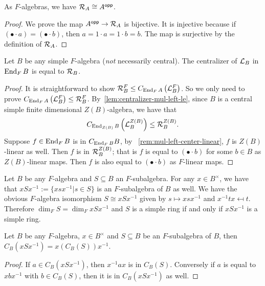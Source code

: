  \begin{lemma}\label{lem:mul-right-iso-opp}
   As $F$-algebras, we have $\mathcal{R}_{A}\cong A^{\mathsf{opp}}$. \leanok
 \end{lemma}
 \begin{proof}
   We prove the map $A^{\mathsf{opp}} \to \mathcal{R}_{A}$ is bijective. It is injective
   because if $\left(\bullet \cdot a\right) = \left(\bullet\cdot b\right)$, then
   $a = 1 \cdot a = 1 \cdot b = b$. The map is surjective by the definition of
   $\mathcal{R}_{A}$.
 \end{proof}
 \begin{lemma}\label{lem:centralizer-mul-left-eq-mul-right}
   Let $B$ be any simple $F$-algebra ({\em not\/} necessarily central). The
   centralizer of $\mathcal{L}_{B}$ in $\operatorname{End}_{F}B$ is equal to $\mathcal{R}_{B}$. \leanok
 \end{lemma}
 \begin{proof}
   It is straightforward to show
   $\mathcal{R}_{B}^{F}\le C_{\operatorname{End}_{F}A}\left(\mathcal{L}_{B}^{F}\right)$. So we only need to
   prove $C_{\operatorname{End}_{F}A}\left(\mathcal{L}_{B}^{F}\right)\le \mathcal{R}_{B}^{F}$.
   By~\cref{lem:centralizer-mul-left-le}, since $B$ is a central simple finite
   dimensional $Z(B)$-algebra, we have that
   \[
     C_{\operatorname{End}_{Z(B)}B}\left(\mathcal{L}_{B}^{Z(B)}\right) \le \mathcal{R}_{B}^{Z(B)}.
   \]
   Suppose $f\in\operatorname{End}_{F}B$ is in $C_{\operatorname{End}_{F}B}B$, by
   ~\cref{rem:mul-left-center-linear}, $f$ is $Z(B)$-linear as well. Then $f$ is
   in $\mathcal{R}_{B}^{Z(B)}$; that is $f$ is equal to $\left(\bullet\cdot b\right)$
   for some $b \in B$ as $Z(B)$-linear maps. Then $f$ is also equal to
   $\left(\bullet\cdot b\right)$ as $F$-linear maps.
 \end{proof}

 \begin{construction}
   Let $B$ be any $F$-algebra and $S\subseteq B$ an $F$-subalgebra. For any
   $x\in B^{\times}$, we have that $x S x^{-1}:=\{xsx^{-1}|s\in S\}$ is an
   $F$-subalgebra of $B$ as well. We have the obvious $F$-algebra isomorphism
   $S \cong xSx^{-1}$ given by $s\mapsto xsx^{-1}$ and $x^{-1}tx\mapsfrom t$.
   Therefore $\dim_{F}S=\dim_{F}xSx^{-1}$ and $S$ is a simple ring if and only
   if $xSx^{-1}$ is a simple ring.
   \leanok
 \end{construction}

 \begin{lemma}
   \label{lem:centralizer-conj}
   Let $B$ be any $F$-algebra, $x \in B^{\times}$ and $S\subseteq B$ be an
   $F$-subalgebra of $B$, then $C_{B}(xSx^{-1})=x\left(C_{B}(S)\right)x^{-1}$.
   \leanok
 \end{lemma}
 \begin{proof}
   If $a \in C_{B}\left(xSx^{-1}\right)$, then $x^{-1}ax$ is in $C_{B}(S)$.
   Conversely if $a$ is equal to $xbx^{-1}$ with $b\in C_{B}(S)$, then it is in
   $C_{B}\left(xSx^{-1}\right)$ as well.
 \end{proof}


